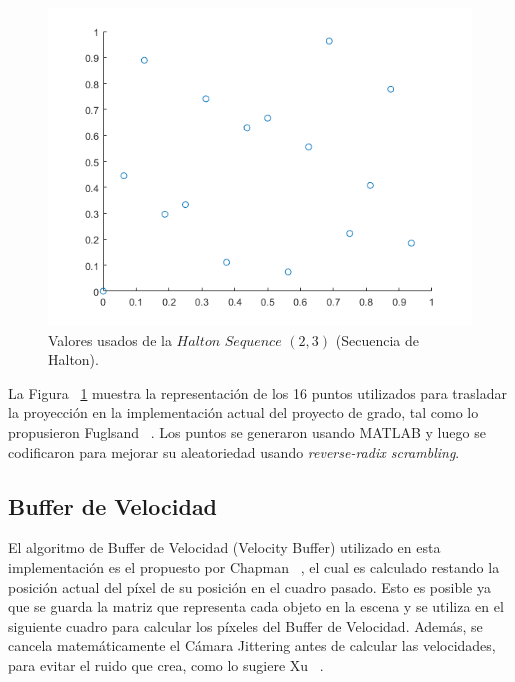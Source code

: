 \documentclass[pregrado]{tesis-usb} %
\begin{document}
\begin{figure}[!hbt]
	\centering
	\includegraphics[scale=0.5]{images/halton_16.png}
	\caption{Valores usados de la $Halton$ $Sequence$ $(2,3)$ (Secuencia de Halton).}\label{fig:halton16}
\end{figure}

La Figura ~\ref{fig:halton16} muestra la representación de los 16 puntos utilizados para trasladar la proyección en la implementación actual del proyecto de grado, tal como lo propusieron Fuglsand ~\cite{Fuglsand2016}. Los puntos se generaron usando MATLAB y luego se codificaron para mejorar su aleatoriedad usando \textit{reverse-radix scrambling}.

\subsection{Buffer de Velocidad}
El algoritmo de Buffer de Velocidad (Velocity Buffer) utilizado en esta implementación es el propuesto por Chapman ~\cite{Chapman2012}, el cual es calculado restando la posición actual del píxel de su posición en el cuadro pasado. Esto es posible ya que se guarda la matriz que representa cada objeto en la escena y se utiliza en el siguiente cuadro para calcular los píxeles del Buffer de Velocidad. Además, se cancela matemáticamente el Cámara Jittering antes de calcular las velocidades, para evitar el ruido que crea, como lo sugiere Xu ~\cite{XU2016}. 
\end{document}
